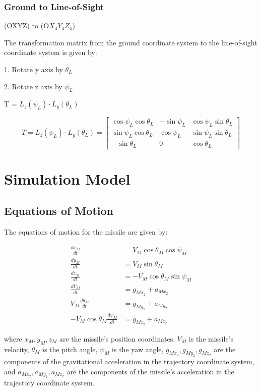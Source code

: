 \documentclass{article}
\begin{document}
\newpage
\subsubsection{Ground to Line-of-Sight}

(OXYZ) to (O\(X_4Y_4Z_4\))

The transformation matrix from the ground coordinate system to the line-of-sight coordinate system is given by:

1. Rotate y axis by \(\theta_L\)

2. Rotate z axis by \(\psi_L\)


T = \(L_z(\psi_L) \cdot L_y(\theta_L)\)

\[
T = L_z(\psi_L) \cdot L_y(\theta_L) =
\begin{bmatrix}
\cos \psi_L \cos \theta_L & -\sin \psi_L & \cos \psi_L \sin \theta_L \\
\sin \psi_L \cos \theta_L & \cos \psi_L & \sin \psi_L \sin \theta_L \\
-\sin \theta_L & 0 & \cos \theta_L
\end{bmatrix}
\]








\newpage
\section{Simulation Model}
\subsection{Equations of Motion}
The equations of motion for the missile are given by:


\begin{align}
  \frac{dx_M}{dt} &= V_M \cos \theta_M \cos \psi_M \\
  \frac{dy_M}{dt} &= V_M \sin \theta_M \\
  \frac{dz_M}{dt} &= -V_M \cos \theta_M \sin \psi_M \\
  \frac{dV_M}{dt} &= g_{Mx_2} + a_{Mx_2} \\
  V_M \frac{d\theta_M}{dt} &= g_{My_2} + a_{My_2} \\
  -V_M \cos \theta_M \frac{d\psi_M}{dt} &= g_{Mz_2} + a_{Mz_2}
  \end{align}
  
  where \(x_M, y_M, z_M\) are the missile's position coordinates, \(V_M\) is the missile's velocity, \(\theta_M\) is the pitch angle, \(\psi_M\) is the yaw angle, \(g_{Mx_2}, g_{My_2}, g_{Mz_2}\) are the components of the gravitational acceleration in the trajectory coordinate system, and \(a_{Mx_2}, a_{My_2}, a_{Mz_2}\) are the components of the missile's acceleration in the trajectory coordinate system.
\end{document}
